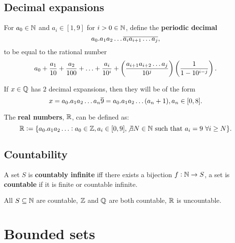 \documentclass{article}
\begin{document}
\subsection{Decimal expansions}

\begingroup\belowdisplayskip=-0pt

\begin{definition}
    For $a_0\in\mathbb{N}$ and $a_i\in[1,9]$ for $i>0\in\mathbb{N}$, define the \textbf{periodic decimal} \[
        a_0.a_1a_2\ldots\overline{a_ia_{i+1}\ldots a_j}
    \textcolor{black}{,}
    \] to be equal to the rational number \[
        a_0 + \frac{a_1}{10} + \frac{a_2}{100} + \ldots + \frac{a_i}{10^i} + \br{\frac{a_{i+1}a_{i+2}\ldots a_j}{10^j}}\br{\frac{1}{1-10^{i-j}}}
    \textcolor{black}{.}
    \]
\end{definition}

\endgroup
\begingroup\belowdisplayskip=-10pt

\begin{theorem}
    If $x\in\mathbb{Q}$ has $2$ decimal expansions, then they will be of the form \[
        x=a_0.a_1a_2\ldots a_n\overline{9} = a_0.a_1a_2\ldots(a_n+1), a_n\in[0,8]
    \textcolor{black}{.}    
    \]
\end{theorem}

\begin{definition}
    The \textbf{real numbers}, $\mathbb{R}$, can be defined as: \[
        \mathbb{R}:= \{a_0.a_1a_2\ldots : a_0\in\mathbb{Z}, a_i\in[0,9],\not\exists N\in\mathbb{N} \ \text{\textcolor{black}{such that }} a_i=9 \ \forall i\geq N\}
    \textcolor{black}{.}
    \]
\end{definition}

\endgroup

\subsection{Countability}

\begin{definition}[Countability]
    A set $S$ is \textbf{countably infinite} iff there exists a bijection $f:\mathbb{N}\rightarrow S$, a set is \textbf{countable} if it is finite or countable infinite.
\end{definition}

\begin{theorem}
    All $S\subseteq\mathbb{N}$ are countable, $\mathbb{Z}$ and $\mathbb{Q}$ are both countable, $\mathbb{R}$ is uncountable.
\end{theorem}

\section{Bounded sets}
\end{document}
